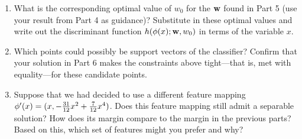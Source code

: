 \documentclass[submit]{../harvardml}
\begin{document}
\begin{problem}
\begin{enumerate}
    \item What is the corresponding optimal value of $w_0$ for the $\mathbf{w}$ found in Part 5 (use your result from Part 4 as guidance)? Substitute in these optimal values and write out the discriminant function
    $h(\mathbf{\phi}(x);\mathbf{w},w_0)$ in terms of the variable $x$.

    \item Which points could possibly be support vectors of the classifier?  Confirm that
    your solution in Part 6 makes the constraints above tight---that is,
    met with equality---for these candidate points.

    \item Suppose that we had decided to use a different feature mapping
    $\mathbf{\phi}'(x) = (x, -\frac{31}{12}x^2 + \frac{7}{12}x^4 )$.  Does
    this feature mapping still admit a separable solution?  How does
    its margin compare to the margin in the previous parts?  Based on
    this, which set of features might you prefer and why?   
  \end{enumerate}
\end{problem}
\newpage
\end{document}
